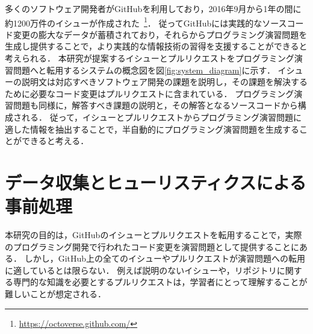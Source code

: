 多くのソフトウェア開発者がGitHubを利用しており，2016年9月から1年の間に約1200万件のイシューが作成された~\footnote{\url{https://octoverse.github.com/}}．
従ってGitHubには実践的なソースコード変更の膨大なデータが蓄積されており，それらからプログラミング演習問題を生成し提供することで，より実践的な情報技術の習得を支援することができると考えられる．
本研究が提案するイシューとプルリクエストをプログラミング演習問題へと転用するシステムの概念図を図\ref{fig:system_diagram}に示す．
イシューの説明文は対応すべきソフトウェア開発の課題を説明し，その課題を解決するために必要なコード変更はプルリクエストに含まれている．
プログラミング演習問題も同様に，解答すべき課題の説明と，その解答となるソースコードから構成される．
従って，イシューとプルリクエストからプログラミング演習問題に適した情報を抽出することで，半自動的にプログラミング演習問題を生成することができると考える．


\section{データ収集とヒューリスティクスによる事前処理}

本研究の目的は，GitHubのイシューとプルリクエストを転用することで，実際のプログラミング開発で行われたコード変更を演習問題として提供することにある．
しかし，GitHub上の全てのイシューやプルリクエストが演習問題への転用に適しているとは限らない．
例えば説明のないイシューや，リポジトリに関する専門的な知識を必要とするプルリクエストは，学習者にとって理解することが難しいことが想定される．

